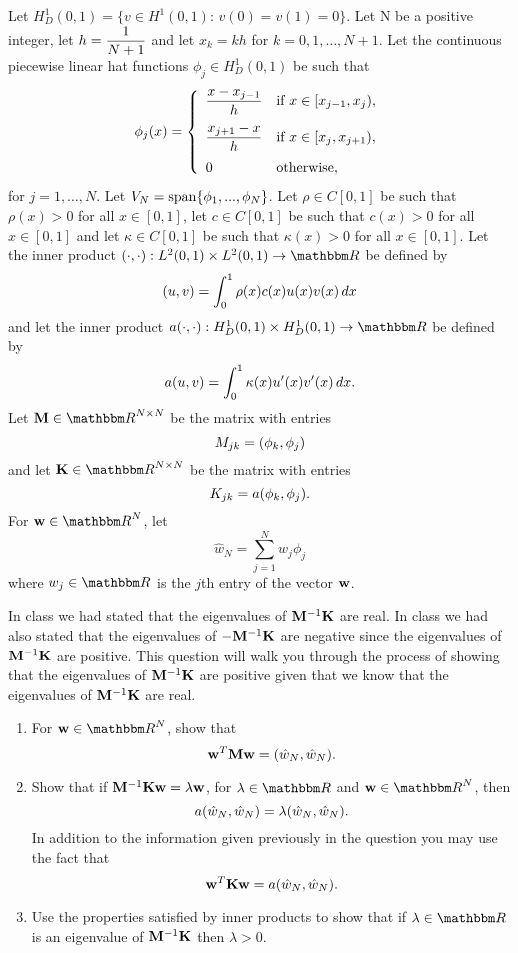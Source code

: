Let $H^1_D\left(0,1\right)=\{v\in H^1\left(0,1\right):\,v(0)=v(1)=0\}$. Let N be a positive integer, let $\displaystyle{h={1 \over N+1}}$ and let $x_k=kh$ for $k=0,1,\ldots,N+1$. Let the continuous piecewise linear hat functions $\phi_j\in H^1_D(0,1)$ be such that
\[
\phi_j(x) = \left\{\begin{array}{ll}
\displaystyle{{x-x_{j-1} \over h}} & \displaystyle{\mbox{if }x\in[x_{j-1},x_j)},
\\[10pt]
\displaystyle{{x_{j+1}-x \over h}} & \displaystyle{\mbox{if }x\in[x_j,x_{j+1})},
\\[10pt]
0 & \mbox{otherwise},
\end{array}\right.
\]
for $j=1,\ldots,N$. Let $V_N={\rm span}\{\phi_1,...,\phi_N\}$. Let $\rho\in C[0,1]$ be such that $\rho(x)>0$ for all $x\in[0,1]$, let $c\in C[0,1]$ be such that $c(x)>0$ for all $x\in[0,1]$ and let $\kappa\in C[0,1]$ be such that $\kappa(x)>0$ for all $x\in[0,1]$. Let the inner product $\ip{\cdot,\cdot}:L^2(0,1)\times L^2(0,1)\to\R$ be defined by
\[
(u,v)=\int_0^1\rho(x)c(x)u(x)v(x)\,dx
\]
and let the inner product $a\ip{\cdot,\cdot}:H^1_D(0,1)\times H^1_D(0,1)\to\R$ be defined by
\[
a(u,v)=\int_0^1\kappa(x)u'(x)v'(x)\,dx.
\]
Let $\BM\in\R^{N\times N}$ be the matrix with entries
\[
M_{jk}=(\phi_k,\phi_j)
\]
and let $\BK\in\R^{N\times N}$ be the matrix with entries
\[
K_{jk}=a(\phi_k,\phi_j).
\]
For $\Bw\in\R^N$, let
\[
\hat{w}_N=\sum_{j=1}^Nw_j\phi_j
\]
where $w_j\in\R$ is the $j$th entry of the vector ${\bf w}$.

In class we had stated that the eigenvalues of ${\bf M}^{-1}{\bf K}$ are real. In class we had also stated that the eigenvalues of $-{\bf M}^{-1}{\bf K}$ are negative since the eigenvalues of ${\bf M}^{-1}{\bf K}$ are positive. This question will walk you through the process of showing that the eigenvalues of ${\bf M}^{-1}{\bf K}$ are positive given that we know that the eigenvalues of ${\bf M}^{-1}{\bf K}$ are real.

\begin{enumerate}
\item For $\Bw\in\R^N$, show that
\[
{\bf w}^T{\bf M}{\bf w}=(\hat{w}_N,\hat{w}_N).
\]

\item Show that if ${\bf M}^{-1}{\bf K}{\bf w}=\lambda{\bf w}$, for $\lambda\in\R$ and $\Bw\in\R^N$, then
\[
a(\hat{w}_N,\hat{w}_N)=\lambda(\hat{w}_N,\hat{w}_N).
\]
In addition to the information given previously in the question you may use the fact that
\[
{\bf w}^T{\bf K}{\bf w}=a(\hat{w}_N,\hat{w}_N).
\]

\item Use the properties satisfied by inner products to show that if $\lambda\in\R$ is an eigenvalue of ${\bf M}^{-1}{\bf K}$ then $\lambda>0$.
\end{enumerate}

